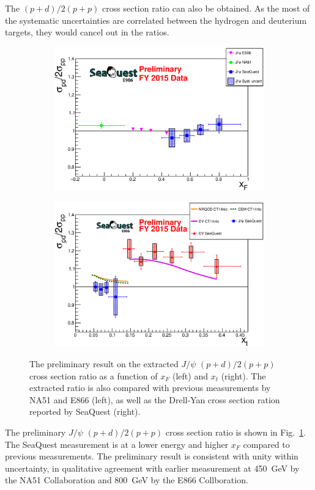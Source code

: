 \documentclass[10pt, a4paper,final]{article}
\begin{document}
The $(p+d)/2(p+p)$ cross section ratio can also be obtained. As the most of the
systematic uncertainties are correlated between the hydrogen and deuterium targets,
they would cancel out in the ratios.
\begin{figure}[htbp!]
	\centering
	\begin{subfigure}{0.45\linewidth}
		\includegraphics[width=0.9\linewidth]{jPsi_all_noTheory_v2}
	\end{subfigure}
	\begin{subfigure}{0.45\linewidth}
		\includegraphics[width=0.9\linewidth]{jPsi_csr_x2_nature_NRQCD_CEM}
	\end{subfigure}
	\caption{The preliminary result on the extracted $J/\psi$ $(p+d)/2(p+p)$
		cross section ratio as a function of $x_F$ (left) and $x_t$ (right).
		The extracted ratio is also compared with previous measurements by NA51
		\cite{abreu1998} and E866 \cite{peng2003} (left), as well as the Drell-Yan
		cross section ration reported by SeaQuest\cite{dove2021} (right).}
	\label{fig:csr}
\end{figure}
The preliminary $J/\psi$ $(p+d)/2(p+p)$ cross section ratio is shown in
Fig.~\ref{fig:csr}. The SeaQuest measurement is at a lower energy and higher $x_F$
compared to previous measurements. The preliminary result is consistent with unity
within uncertainty, in qualitative agreement with earlier measurement at \SI{450}{\GeV}
by the NA51 Collaboration and \SI{800}{\GeV} by the E866 Collboration.
\end{document}
